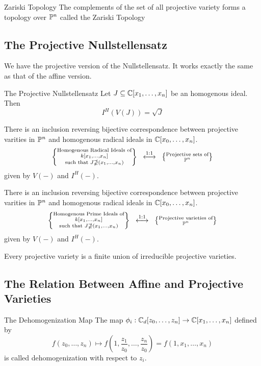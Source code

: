 \documentclass[a4paper]{article}
\begin{document}
\begin{crl}{Zariski Topology}{} The complements of the set of all projective variety forms a topology over $\mathbb{P}^n$ called the Zariski Topology
\end{crl}

\subsection{The Projective Nullstellensatz}
We have the projective version of the Nullstellensatz. It works exactly the same as that of the affine version. 

\begin{thm}{The Projective Nullstellensatz}{} Let $J\subseteq\mathbb{C}[x_1,\dots,x_n]$ be an homogenous ideal. Then $$I^H(V(J))=\sqrt{J}$$
\end{thm}

\begin{crl}{}{} There is an inclusion reversing bijective correspondence between projective varities in $\mathbb{P}^n$ and homogenous radical ideals in $\mathbb{C}[x_0,\dots,x_n]$. $$\left\{\substack{\text{Homogenous Radical Ideals of}\\ k[x_1,\dots,x_n]\\\text{such that }J\nsupseteq(x_1,\dots,x_n)}\right\}\;\;\overset{\text{1:1}}{\longleftrightarrow}\;\;\left\{\substack{\text{Projective sets of}\\ \mathbb{P}^n}\right\}$$ given by $V(-)$ and $I^H(-)$. 
\end{crl}

\begin{crl}{}{} There is an inclusion reversing bijective correspondence between projective varities in $\mathbb{P}^n$ and homogenous radical ideals in $\mathbb{C}[x_0,\dots,x_n]$. $$\left\{\substack{\text{Homogenous Prime Ideals of}\\ k[x_1,\dots,x_n]\\\text{such that }J\nsupseteq(x_1,\dots,x_n)}\right\}\;\;\overset{\text{1:1}}{\longleftrightarrow}\;\;\left\{\substack{\text{Projective varieties of}\\ \mathbb{P}^n}\right\}$$ given by $V(-)$ and $I^H(-)$. 
\end{crl}

\begin{prp}{}{} Every projective variety is a finite union of irreducible projective varieties. 
\end{prp}

\subsection{The Relation Between Affine and Projective Varieties}
\begin{defn}{The Dehomogenization Map}{} The map $\phi_i:\mathbb{C}_d[z_0,\dots,z_n]\to\mathbb{C}[x_1,\dots,x_n]$ defined by $$f(z_0,\dots,z_n)\mapsto f\left(1,\frac{z_1}{z_0},\dots,\frac{z_n}{z_0}\right)=f(1,x_1,\dots,x_n)$$ is called dehomogenization with respect to $z_i$. 
\end{defn}
\end{document}
